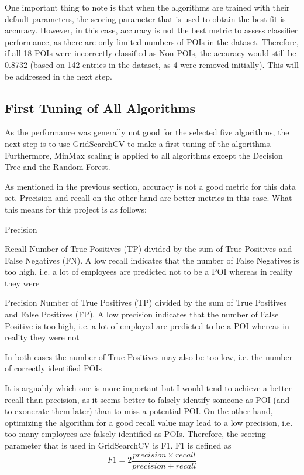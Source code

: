 \documentclass[11pt]{article} %
\begin{document}
One important thing to note is that when the algorithms are trained with their default parameters, the scoring parameter that is used to obtain the best fit is accuracy. However, in this case, accuracy is not the best metric to assess classifier performance, as there are only limited numbers of POIs in the dataset. Therefore, if all 18 POIs were incorrectly classified as Non-POIs, the accuracy would still be 0.8732 (based on 142 entries in the dataset, as 4 were removed initially). This will be addressed in the next step.

\subsection{First Tuning of All Algorithms}
As the performance was generally not good for the selected five algorithms, the next step is to use {\selectfont GridSearchCV} to make a first tuning of the algorithms. Furthermore, MinMax scaling is applied to all algorithms except the Decision Tree and the Random Forest.\medskip

As mentioned in the previous section, accuracy is not a good metric for this data set. Precision and recall on the other hand are better metrics in this case. What this means for this project is as follows:
\begin{labeling}{Precision}
\item [Recall] Number of True Positives (TP) divided by the sum of True Positives and False Negatives (FN). A low recall indicates that the number of False Negatives is too high, i.e. a lot of employees are predicted not to be a POI whereas in reality they were
\item [Precision] Number of True Positives (TP) divided by the sum of True Positives and False Positives (FP). A low precision indicates that the number of False Positive is too high, i.e. a lot of employed are predicted to be a POI whereas in reality they were not
\end{labeling}
In both cases the number of True Positives may also be too low, i.e. the number of correctly identified POIs\medskip

It is arguably which one is more important but I would tend to achieve a better recall than precision, as it seems better to falsely identify someone as POI (and to exonerate them later) than to miss a potential POI. On the other hand, optimizing the algorithm for a good recall value may lead to a low precision, i.e. too many employees are falsely identified as POIs. Therefore, the scoring parameter that is used in {\selectfont GridSearchCV} is F1. F1 is defined as
\begin{equation}
     F1 = 2\frac{precision \times recall}{precision + recall}
  \end{equation}
\end{document}
